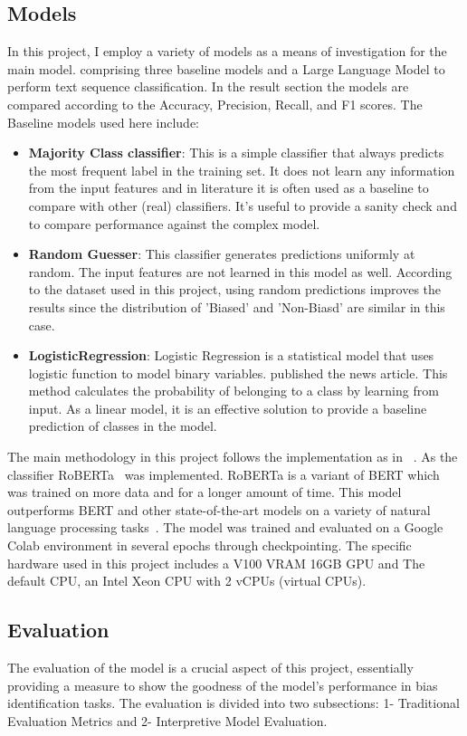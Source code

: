 \documentclass[11pt,a4paper]{article}
\begin{document}
\subsection{Models}
In this project, I employ a variety of models as a means of investigation for the main model. comprising three baseline models and a Large Language Model to perform text sequence classification. In the result section the models are compared according to the Accuracy, Precision, Recall, and F1 scores.
The Baseline models used here include:
\begin{itemize}
    \item \textbf{Majority Class classifier}: This is a simple classifier that always predicts the most frequent label in the training set. It does not learn any information from the input features and in literature it is often used as a baseline to compare with other (real) classifiers. It’s useful to provide a sanity check and to compare performance against the complex model.
    \item \textbf{Random Guesser}: This classifier generates predictions uniformly at random. The input features are not learned in this model as well. According to the dataset used in this project, using random predictions improves the results since the distribution of 'Biased' and 'Non-Biasd' are similar in this case. 
    \item \textbf{LogisticRegression}: Logistic Regression is a statistical model that uses logistic function to model binary variables. published the news article. This method calculates the probability of belonging to a class by learning from input. As a linear model, it is an effective solution to provide a baseline prediction of classes in the model.
\end{itemize}
The main methodology in this project follows the implementation as in ~\cite{spinde_2021_neural}. As the classifier RoBERTa~\cite{liu_2019_roberta} was implemented. RoBERTa is a variant of BERT which was trained on more data and for a longer amount of time. This model outperforms BERT and other state-of-the-art models on a variety of natural language processing tasks~\cite{a2020_overview}. The model was trained and evaluated on a Google Colab environment in several epochs through checkpointing. The specific hardware used in this project includes a V100 VRAM 16GB GPU and The default CPU, an Intel Xeon CPU with 2 vCPUs (virtual CPUs).
\subsection{Evaluation}
The evaluation of the model is a crucial aspect of this project, essentially providing a measure to show the goodness of the model's performance in bias identification tasks. The evaluation is divided into two subsections: 1- Traditional Evaluation Metrics and 2- Interpretive Model Evaluation.
\end{document}

